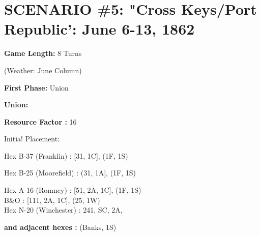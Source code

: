 \section{SCENARIO \#5: "Cross Keys/Port Republic': June 6-13, 1862
}


\begin{scenariodata}
\textbf{Game Length:} 8 Turns\\
\end{scenariodata}

\begin{scenariodata}
(Weather: June Column)\\
\end{scenariodata}

\begin{scenariodata}
\textbf{First Phase:} Union\\
\end{scenariodata}

\begin{scenariodata}
\textbf{Union:}\\
\end{scenariodata}

\begin{scenariodata}
\textbf{Resource Factor :} 16\\
\end{scenariodata}

Initia! Placement:

\begin{scenariodata}
Hex B-37 (Franklin) : [31, 1C], (1F, 1S)\\
\end{scenariodata}

\begin{scenariodata}
Hex B-25 (Moorefield) : (31, 1A], (1F, 1S)\\
\end{scenariodata}

\begin{scenariodata}
Hex A-16 (Romney) : [51, 2A, 1C], (1F, 1S)\\
B\&O : [111, 2A, 1C], (25, 1W)\\
Hex N-20 (Winchester) : 241, SC, 2A,\\
\end{scenariodata}

\begin{scenariodata}
\textbf{and adjacent hexes :} (Banks, 1S)\\
\end{scenariodata}

